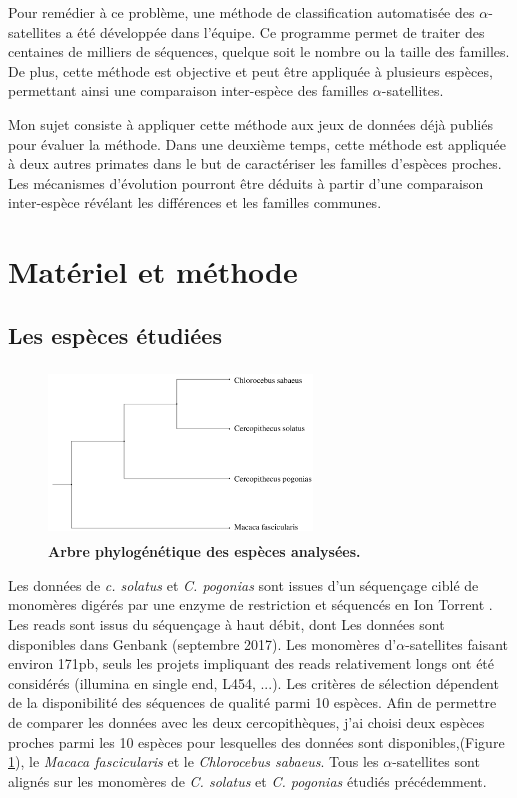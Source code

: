 \documentclass[12pt,a4paper]{article}
\begin{document}
Pour remédier à ce problème, une méthode de classification automatisée des $\alpha$-satellites a été développée dans l'équipe. Ce programme permet de traiter des centaines de milliers de séquences, quelque soit le nombre ou la taille des familles. De plus, cette méthode est objective et peut être appliquée à plusieurs espèces, permettant ainsi une comparaison inter-espèce des familles $\alpha$-satellites. 

Mon sujet consiste à appliquer cette méthode aux jeux de données déjà publiés pour évaluer la méthode. Dans une deuxième temps, cette méthode est appliquée à deux autres primates dans le but de  caractériser les familles d'espèces proches. Les mécanismes d'évolution pourront être déduits à partir d'une comparaison inter-espèce révélant les différences et les familles communes. 

\section{Matériel et méthode}
\subsection{Les espèces étudiées}

	\begin{figure}
		\center
		\includegraphics[height=4.5cm, width=7cm]{img/arbre_especes.png}
		\caption{\textbf{Arbre phylogénétique des espèces analysées.}\cite{Cacheux_evolution}
		\label{fig:arbre_presentation}}
	\end{figure}

Les données de \textit{c. solatus} et \textit{C. pogonias} sont issues d'un séquençage ciblé de monomères digérés par une enzyme de restriction et séquencés en Ion Torrent \cite{Benjak2015}. Les reads sont issus du séquençage à haut débit, dont Les données sont disponibles dans Genbank (septembre 2017). Les monomères d'$\alpha$-satellites faisant environ 171pb,  seuls les projets impliquant des reads relativement longs ont été considérés (illumina en single end, L454, ...).
Les critères de sélection dépendent de la disponibilité des séquences de qualité parmi 10 espèces. Afin de permettre de comparer les données avec les deux cercopithèques, j'ai choisi deux espèces proches parmi les 10 espèces pour lesquelles des données sont disponibles,(Figure \ref{fig:arbre_presentation}), le \textit{Macaca fascicularis} et le \textit{Chlorocebus sabaeus}. Tous les $\alpha$-satellites sont alignés sur les monomères de \textit{C. solatus} et \textit{C. pogonias} étudiés précédemment.
\end{document}
